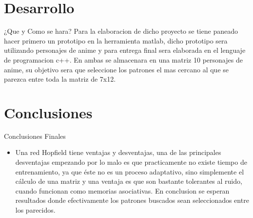 \documentclass{beamer}
\begin{document}
\section{Desarrollo}
\begin{frame}{¿Que y Como se hara?}
    Para la elaboracion de dicho proyecto se tiene paneado hacer primero un prototipo en la herramienta matlab, dicho prototipo sera utilizando personajes de anime y para entrega final sera elaborada en el lenguaje de programacion c++.
    En ambas se almacenara en una matriz 10 personajes de anime, su objetivo sera que seleccione los  patrones el mas cercano al que se parezca entre toda la matriz de 7x12.
 \begin{figure}[H]
  
 \end{figure}
\end{frame}

\section{Conclusiones}
\begin{frame}{Conclusiones Finales}
\begin{itemize}
        \item Una red Hopfield tiene ventajas y desventajas, una de las principales desventajas empezando por lo malo es que practicamente no existe tiempo de entrenamiento, ya que éste no es un proceso adaptativo, sino simplemente el cálculo de una matriz y una ventaja es que  son bastante tolerantes al ruido, cuando funcionan como memorias asociativas.  En conclusion se esperan resultados donde efectivamente los patrones buscados sean seleccionados entre los parecidos.
    \end{itemize}
\end{frame}
\end{document}
